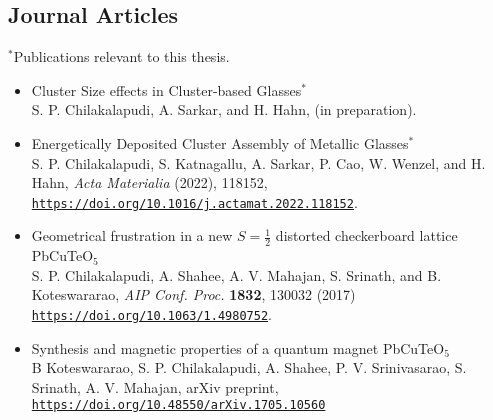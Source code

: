 \subsection*{Journal Articles}
$^*$Publications relevant to this thesis.

\begin{itemize}%
\item \textsf{{Cluster Size effects in Cluster-based Glasses$^*$}}\\
S. P. Chilakalapudi, A. Sarkar, and H. Hahn, (in preparation). %

\item \textsf{Energetically Deposited Cluster Assembly of Metallic Glasses$^*$}\\
S. P. Chilakalapudi, S. Katnagallu, A. Sarkar, P. Cao, W. Wenzel, and H. Hahn, \textit{Acta Materialia} (2022), 118152, \texttt{\href{https://doi.org/10.1016/j.actamat.2022.118152}{https://doi.org/10.1016/j.actamat.2022.118152}}.

\item \textsf{Geometrical frustration in a new $S=\frac{1}{2}$ distorted checkerboard lattice PbCuTeO$_5$}\\
S. P. Chilakalapudi, A. Shahee, A. V. Mahajan, S. Srinath, and B. Koteswararao, \textit{AIP Conf. Proc.} \textbf{1832}, 130032 (2017) \texttt{\href{https://doi.org/10.1063/1.4980752}{https://doi.org/10.1063/1.4980752}}.

\item \textsf{Synthesis and magnetic properties of a quantum magnet PbCuTeO$_5$}\\
B Koteswararao, S. P. Chilakalapudi, A. Shahee, P. V. Srinivasarao, S. Srinath, A. V. Mahajan, arXiv preprint, \texttt{\href{https://doi.org/10.48550/arXiv.1705.10560}{https://doi.org/10.48550/arXiv.1705.10560}}
\end{itemize}

